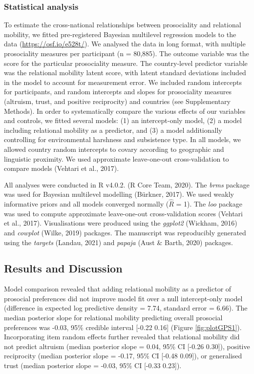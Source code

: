 \documentclass[english,man,floatsintext]{apa6}
\begin{document}
\hypertarget{statistical-analysis}{%
\subsubsection{Statistical analysis}\label{statistical-analysis}}

To estimate the cross-national relationships between prosociality and relational mobility, we fitted pre-registered Bayesian multilevel regression models to the data (\url{https://osf.io/e528t/}). We analysed the data in long format, with multiple prosociality measures per participant (n = 80,885). The outcome variable was the score for the particular prosociality measure. The country-level predictor variable was the relational mobility latent score, with latent standard deviations included in the model to account for measurement error. We included random intercepts for participants, and random intercepts and slopes for prosociality measures (altruism, trust, and positive reciprocity) and countries (see Supplementary Methods). In order to systematically compare the various effects of our variables and controls, we fitted several models: (1) an intercept-only model, (2) a model including relational mobility as a predictor, and (3) a model additionally controlling for environmental harshness and subsistence type. In all models, we allowed country random intercepts to covary according to geographic and linguistic proximity. We used approximate leave-one-out cross-validation to compare models (Vehtari et al., 2017).

All analyses were conducted in R v4.0.2. (R Core Team, 2020). The \emph{brms} package was used for Bayesian multilevel modelling (Bürkner, 2017). We used weakly informative priors and all models converged normally (\(\hat{R}\) = 1). The \emph{loo} package was used to compute approximate leave-one-out cross-validation scores (Vehtari et al., 2017). Visualisations were produced using the \emph{ggplot2} (Wickham, 2016) and \emph{cowplot} (Wilke, 2019) packages. The manuscript was reproducibly generated using the \emph{targets} (Landau, 2021) and \emph{papaja} (Aust \& Barth, 2020) packages.

\hypertarget{results-and-discussion}{%
\subsection{Results and Discussion}\label{results-and-discussion}}

Model comparison revealed that adding relational mobility as a predictor of prosocial preferences did not improve model fit over a null intercept-only model (difference in expected log predictive density = 7.74, standard error = 6.66). The median posterior slope for relational mobility predicting overall prosocial preferences was -0.03, 95\% credible interval {[}-0.22 0.16{]} (Figure \ref{fig:plotGPS1}). Incorporating item random effects further revealed that relational mobility did not predict altruism (median posterior slope = 0.04, 95\% CI {[}-0.26 0.30{]}), positive reciprocity (median posterior slope = -0.17, 95\% CI {[}-0.48 0.09{]}), or generalised trust (median posterior slope = -0.03, 95\% CI {[}-0.33 0.23{]}).
\end{document}
